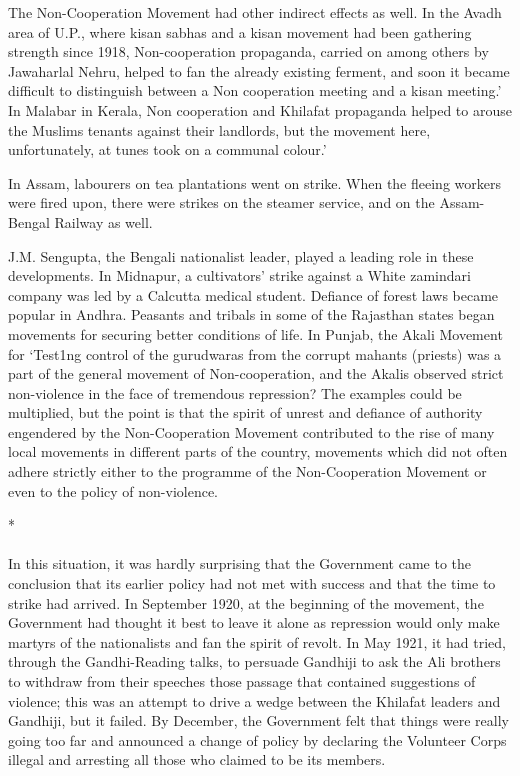 \begin{multicols}{2}
The Non-Cooperation Movement had other indirect effects as well. In the Avadh area of U.P., where kisan sabhas and a kisan movement had been gathering strength since 1918, Non-cooperation propaganda, carried on among others by Jawaharlal Nehru, helped to fan the already existing ferment, and soon it became difficult to distinguish between a Non cooperation meeting and a kisan meeting.' In Malabar in Kerala, Non cooperation and Khilafat propaganda helped to arouse the Muslims tenants against their landlords, but the movement here, unfortunately, at tunes took on a communal colour.' 

In Assam, labourers on tea plantations went on strike. When the fleeing workers were fired upon, there were strikes on the steamer service, and on the Assam-Bengal Railway as well. 

J.M. Sengupta, the Bengali nationalist leader, played a leading role in these developments. In Midnapur, a cultivators' strike against a White zamindari company was led by a Calcutta medical student. Defiance of forest laws became popular in Andhra. Peasants and tribals in some of the Rajasthan states began movements for securing better conditions of life. In Punjab, the Akali Movement for `Test1ng control of the gurudwaras from the corrupt mahants (priests) was a part of the general movement of Non-cooperation, and the Akalis observed strict non-violence in the face of tremendous repression? The examples could be multiplied, but the point is that the spirit of unrest and defiance of authority engendered by the Non-Cooperation Movement contributed to the rise of many local movements in different parts of the country, movements which did not often adhere strictly either to the programme of the Non-Cooperation Movement or even to the policy of non-violence.

\begin{center}*\end{center}

\paragraph*{}

In this situation, it was hardly surprising that the Government came to the conclusion that its earlier policy had not met with success and that the time to strike had arrived. In September 1920, at the beginning of the movement, the Government had thought it best to leave it alone as repression would only make martyrs of the nationalists and fan the spirit of revolt. In May 1921, it had tried, through the Gandhi-Reading talks, to persuade Gandhiji to ask the Ali brothers to withdraw from their speeches those passage that contained suggestions of violence; this was an attempt to drive a wedge between the Khilafat leaders and Gandhiji, but it failed. By December, the Government felt that things were really going too far and announced a change of policy by declaring the Volunteer Corps illegal and arresting all those who claimed to be its members. 


\end{multicols}
